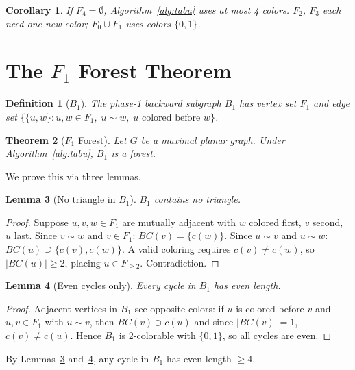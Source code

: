 \documentclass[11pt,twocolumn]{article}
\newtheorem{theorem}{Theorem}[section]
\newtheorem{lemma}[theorem]{Lemma}
\newtheorem{corollary}[theorem]{Corollary}
\newtheorem{definition}{Definition}[section]
\begin{document}
\begin{corollary}
\label{cor:four}
If $F_4=\emptyset$, Algorithm~\ref{alg:tabu} uses at most 4 colors.
$F_2$, $F_3$ each need one new color; $F_0\cup F_1$ uses colors $\{0,1\}$.
\end{corollary}

\section{The \texorpdfstring{$F_1$}{F1} Forest Theorem}
\label{sec:forest}

\begin{definition}[$B_1$]
The \emph{phase-1 backward subgraph} $B_1$ has vertex set $F_1$ and edge set
$\{\{u,w\}:u,w\in F_1,\;u\sim w,\;u\text{ colored before }w\}$.
\end{definition}

\begin{theorem}[$F_1$ Forest]
\label{thm:f1forest}
Let $G$ be a maximal planar graph. Under Algorithm~\ref{alg:tabu}, $B_1$ is a
forest.
\end{theorem}

We prove this via three lemmas.

\begin{lemma}[No triangle in $B_1$]
\label{lem:k3}
$B_1$ contains no triangle.
\end{lemma}

\begin{proof}
Suppose $u,v,w\in F_1$ are mutually adjacent with $w$ colored first, $v$
second, $u$ last. Since $v\sim w$ and $v\in F_1$: $BC(v)=\{c(w)\}$. Since
$u\sim v$ and $u\sim w$: $BC(u)\supseteq\{c(v),c(w)\}$. A valid coloring
requires $c(v)\ne c(w)$, so $|BC(u)|\geq 2$, placing $u\in F_{\geq 2}$.
Contradiction.
\end{proof}

\begin{lemma}[Even cycles only]
\label{lem:even}
Every cycle in $B_1$ has even length.
\end{lemma}

\begin{proof}
Adjacent vertices in $B_1$ see opposite colors: if $u$ is colored before $v$
and $u,v\in F_1$ with $u\sim v$, then $BC(v)\ni c(u)$ and since $|BC(v)|=1$,
$c(v)\ne c(u)$. Hence $B_1$ is 2-colorable with $\{0,1\}$, so all cycles are
even.
\end{proof}

By Lemmas~\ref{lem:k3} and~\ref{lem:even}, any cycle in $B_1$ has even length
$\geq 4$.
\end{document}
